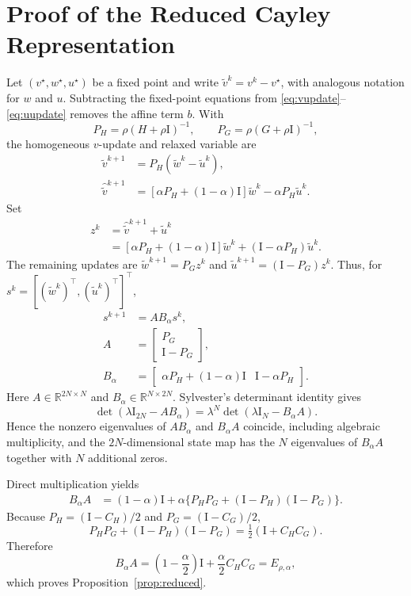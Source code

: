 \documentclass[pdflatex,iicol,sn-mathphys-num]{sn-jnl}
\theoremstyle{definition}
\newcommand{\R}{\mathbb{R}}
\newcommand{\Id}{\mathrm{I}}
\begin{document}
\section{Proof of the Reduced Cayley Representation}\label{app:reduced}
Let $(v^\star,w^\star,u^\star)$ be a fixed point and write
$\widetilde v^k=v^k-v^\star$, with analogous notation for $w$ and $u$.
Subtracting the fixed-point equations from \eqref{eq:vupdate}--\eqref{eq:uupdate}
removes the affine term $b$. With
\[
P_H=\rho(H+\rho\Id)^{-1},\qquad
P_G=\rho(G+\rho\Id)^{-1},
\]
the homogeneous $v$-update and relaxed variable are
\begin{align}
\widetilde v^{k+1}&=P_H(\widetilde w^k-\widetilde u^k),\nonumber\\
\widehat{\widetilde v}^{k+1}
&=[\alpha P_H+(1-\alpha)\Id]\widetilde w^k
-\alpha P_H\widetilde u^k.
\end{align}
Set
\begin{align}
z^k&=\widehat{\widetilde v}^{k+1}+\widetilde u^k\nonumber\\
&=[\alpha P_H+(1-\alpha)\Id]\widetilde w^k
+(\Id-\alpha P_H)\widetilde u^k.
\end{align}
The remaining updates are
$\widetilde w^{k+1}=P_Gz^k$ and
$\widetilde u^{k+1}=(\Id-P_G)z^k$. Thus, for
$s^k=[(\widetilde w^k)^\top,(\widetilde u^k)^\top]^\top$,
\begin{align}
s^{k+1}&=AB_\alpha s^k,\nonumber\\
A&=\begin{bmatrix}P_G\\\Id-P_G\end{bmatrix},\nonumber\\
B_\alpha&=
\begin{bmatrix}
\alpha P_H+(1-\alpha)\Id&\Id-\alpha P_H
\end{bmatrix}.
\end{align}
Here $A\in\R^{2N\times N}$ and $B_\alpha\in\R^{N\times2N}$. Sylvester's
determinant identity gives
\[
\det(\lambda\Id_{2N}-AB_\alpha)
=\lambda^N\det(\lambda\Id_N-B_\alpha A).
\]
Hence the nonzero eigenvalues of $AB_\alpha$ and $B_\alpha A$ coincide,
including algebraic multiplicity, and the $2N$-dimensional state map has the
$N$ eigenvalues of $B_\alpha A$ together with $N$ additional zeros.

Direct multiplication yields
\[
\begin{aligned}
B_\alpha A
&=(1-\alpha)\Id+\alpha\{
P_HP_G+(\Id-P_H)(\Id-P_G)\}.
\end{aligned}
\]
Because $P_H=(\Id-C_H)/2$ and $P_G=(\Id-C_G)/2$,
\[
P_HP_G+(\Id-P_H)(\Id-P_G)
=\tfrac12(\Id+C_HC_G).
\]
Therefore
\[
B_\alpha A
=\left(1-\frac{\alpha}{2}\right)\Id
+\frac{\alpha}{2}C_HC_G=E_{\rho,\alpha},
\]
which proves Proposition~\ref{prop:reduced}.
\end{document}
